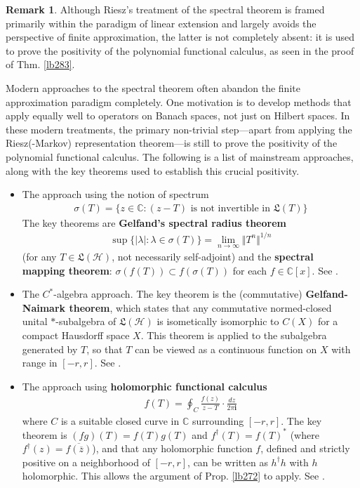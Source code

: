 \documentclass[12pt,b5paper,notitlepage]{article}
\theoremstyle{definition}
\newtheorem{rem}[df]{Remark}
\theoremstyle{plain}
\newcommand{\fk}{\mathfrak}
\newcommand{\ovl}{\overline}
\newcommand{\im}{\mathbf{i}}
\newcommand{\Cbb}{\mathbb C}
\newcommand{\MH}{\mathcal H}
\numberwithin{equation}{section}
\begin{document}
\begin{rem}
Although Riesz's treatment of the spectral theorem is framed primarily within the paradigm of linear extension and largely avoids the perspective of finite approximation, the latter is not completely absent: it is used to prove the positivity of the polynomial functional calculus, as seen in the proof of Thm. \ref{lb283}. 

Modern approaches to the spectral theorem often abandon the finite approximation paradigm completely. One motivation is to develop methods that apply equally well to operators on Banach spaces, not just on Hilbert spaces. In these modern treatments, the primary non-trivial step---apart from applying the Riesz(-Markov) representation theorem---is still to prove the positivity of the polynomial functional calculus. The following is a list of mainstream approaches, along with the key theorems used to establish this crucial positivity.
\begin{itemize}
\item The approach using the notion of spectrum
\begin{align*}
\sigma(T)=\{z\in\Cbb:(z-T)\text{ is not invertible in }\fk L(T)\}
\end{align*}
The key theorems are \textbf{Gelfand's spectral radius theorem}
\begin{align*}
\sup\{|\lambda|:\lambda\in\sigma(T)\}=\lim_{n\rightarrow\infty}\Vert T^n\Vert^{1/n}
\end{align*}
(for any $T\in\fk L(\MH)$, not necessarily self-adjoint) and the \textbf{spectral mapping theorem}: $\sigma(f(T))\subset f(\sigma(T))$ for each $f\in\Cbb[x]$. See \cite{Lax,RS-1}.
\item The $C^*$-algebra approach. The key theorem is the (commutative) \textbf{Gelfand-Naimark theorem}, which states that any  commutative normed-closed unital $*$-subalgebra of $\fk L(\MH)$ is isometically isomorphic to $C(X)$ for a compact Hausdorff space $X$. This theorem is applied to the subalgebra generated by $T$, so that $T$ can be viewed as a continuous function on $X$ with range in $[-r,r]$. See \cite{Rud-F}.
\item The approach using \textbf{holomorphic functional calculus}
\begin{align*}
f(T)=\oint_C\frac{f(z)}{z-T}\cdot\frac{dz}{2\pi\im}
\end{align*}
where $C$ is a suitable closed curve in $\Cbb$ surrounding $[-r,r]$. The key theorem is $(fg)(T)=f(T)g(T)$ and $f^\dagger(T)=f(T)^*$ (where $f^\dagger(z)=\ovl{f(\ovl z)}$), and that any holomorphic function $f$, defined and strictly positive on a neighborhood of $[-r,r]$, can be written as $h^\dagger h$ with $h$ holomorphic. This allows the argument of Prop. \ref{lb272} to apply. See \cite{Gui-S}.

\end{itemize}
\end{rem}
\end{document}
